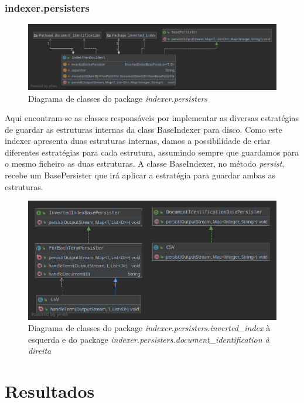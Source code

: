 \documentclass[12pt]{article}
\begin{document}
\subsubsection{indexer.persisters}
\begin{figure}[H]
  \center
  \includegraphics[width=16cm]{packages_indexer_persisters.png}
  \caption{Diagrama de classes do package \it indexer.persisters}
\end{figure}

Aqui encontram-se as classes responsáveis por implementar as diversas
estratégias de guardar as estruturas internas da class BaseIndexer
para disco. Como este indexer apresenta duas estruturas internas,
damos a possibilidade de criar diferentes estratégias para cada
estrutura, assumindo sempre que guardamos para o mesmo ficheiro as
duas estruturas. A classe BaseIndexer, no método {\it persist},
recebe um BasePersister que irá aplicar a estratégia para guardar
ambas as estruturas.

\begin{figure}[h]
  \center
  \includegraphics[width=16cm]{packages_indexer_persisters_impl.png}
  \caption{Diagrama de classes do package {\it indexer.persisters.inverted\_index}
  à esquerda e do package \it indexer.persisters.document\_identification
  à direita}
\end{figure}

\newpage

\section{Resultados}
\end{document}
